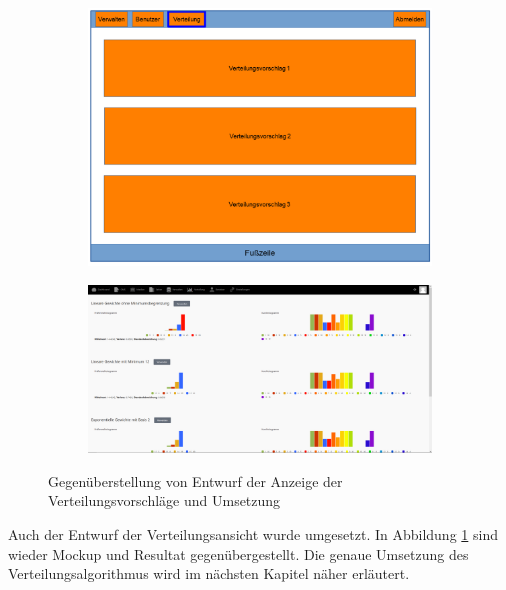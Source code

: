         \begin{figure}[p]
            \centering
            \begin{subfigure}{0.9\textwidth}
                \includegraphics[width=1.0\textwidth]{./implementation/images/MockUpsBackend/backendDistribution.png}
            \end{subfigure}
            \begin{subfigure}{\textwidth}
                \includegraphics[width=1.0\textwidth]{./implementation/images/distribution.png}
            \end{subfigure}
            \caption{Gegenüberstellung von Entwurf der Anzeige der Verteilungsvorschläge und Umsetzung}
            \label{fig:comparisonDistribution}
        \end{figure}
    
        Auch der Entwurf der Verteilungsansicht wurde umgesetzt.
        In Abbildung \ref{fig:comparisonDistribution} sind wieder Mockup und Resultat gegenübergestellt.
        Die genaue Umsetzung des Verteilungsalgorithmus wird im nächsten Kapitel näher erläutert.
		\pagebreak

